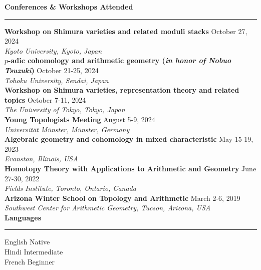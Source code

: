 \documentclass[11pt]{article}
\newenvironment{mysection}{
\color{mygreen}\bfseries\large
}
{
\\ \rule{\textwidth}{1pt}\hspace{-.25em}
} %
\begin{document}
\begin{mysection}Conferences \& Workshops Attended\end{mysection}
\textbf{Workshop on Shimura varieties and related moduli stacks} \hfill October 27, 2024 \\
\emph{Kyoto University, Kyoto, Japan} \\
\textbf{$p$-adic cohomology and arithmetic geometry (\emph{in honor of Nobuo Tsuzuki})} \hfill October 21-25, 2024 \\
\emph{Tohoku University, Sendai, Japan} \\
\textbf{Workshop on Shimura varieties, representation theory and related topics} \hfill October 7-11, 2024 \\
\emph{The University of Tokyo, Tokyo, Japan} \\
\textbf{Young Topologists Meeting} \hfill August 5-9, 2024 \\
\emph{Universit\"{a}t M\"{u}nster, M\"{u}nster, Germany} \\
\textbf{Algebraic geometry and cohomology in mixed characteristic} \hfill May 15-19, 2023 \\
\emph{Evanston, Illinois, USA} \\
\textbf{Homotopy Theory with Applications to Arithmetic and Geometry} \hfill June 27-30, 2022 \\
\emph{Fields Institute, Toronto, Ontario, Canada} \\
\textbf{Arizona Winter School on Topology and Arithmetic} \hfill March 2-6, 2019 \\
\emph{Southwest Center for Arithmetic Geometry, Tucson, Arizona, USA} \\

\begin{mysection}Languages\end{mysection}
English \hfill Native \\
Hindi \hfill Intermediate \\
French \hfill Beginner
\end{document}
